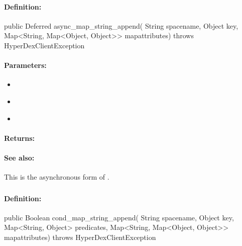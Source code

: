 \paragraph{Definition:}
\begin{javacode}
public Deferred async_map_string_append(
        String spacename,
        Object key,
        Map<String, Map<Object, Object>> mapattributes) throws HyperDexClientException
\end{javacode}

\paragraph{Parameters:}
\begin{itemize}[noitemsep]
\item {}\\

\item {}\\

\item {}\\

\end{itemize}

\paragraph{Returns:}


\paragraph{See also:}  This is the asynchronous form of .

\pagebreak
\subsubsection{}
\label{api:java:cond_map_string_append}


\paragraph{Definition:}
\begin{javacode}
public Boolean cond_map_string_append(
        String spacename,
        Object key,
        Map<String, Object> predicates,
        Map<String, Map<Object, Object>> mapattributes) throws HyperDexClientException
\end{javacode}

